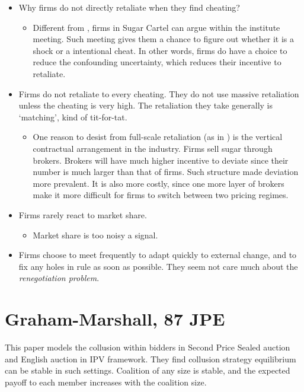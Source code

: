 \documentclass{book}
\theoremstyle{plain}
\theoremstyle{definition}
\begin{document}
\begin{itemize}
	\item Why firms do not directly retaliate when they find cheating?
	\begin{itemize}
		\item Different from \cite{Green_Porter:1984EMCA}, firms in Sugar Cartel can argue within the institute meeting. Such meeting gives them a chance to figure out whether it is a shock or a intentional cheat. In other words, firms do have a choice to reduce the confounding uncertainty, which reduces their incentive to retaliate.
	\end{itemize}
	\item Firms do not retaliate to every cheating. They do not use massive retaliation unless the cheating is very high. The retaliation they take generally is `matching', kind of tit-for-tat.
	\begin{itemize}
		\item One reason to desist from full-scale retaliation (as in \cite{Green_Porter:1984EMCA}) is the vertical contractual arrangement in the industry. Firms sell sugar through brokers. Brokers will have much higher incentive to deviate since their number is much larger than that of firms. Such structure made deviation more prevalent. It is also more costly, since one more layer of brokers make it more difficult for firms to switch between two pricing regimes.
	\end{itemize}
	\item Firms rarely react to market share.
	\begin{itemize}
		\item Market share is too noisy a signal.
	\end{itemize}
	\item Firms choose to meet frequently to adapt quickly to external change, and to fix any holes in rule as soon as possible. They seem not care much about the \textit{renegotiation problem}.
\end{itemize}


\section{Graham-Marshall, 87 JPE} %
\label{sec:graham_marshall_87_jpe}

\textbf{}

This paper models the collusion within bidders in Second Price Sealed auction and English auction in IPV framework.
They find collusion strategy equilibrium can be stable in such settings.
Coalition of any size is stable, and the expected payoff to each member increases with the coalition size.
\end{document}

